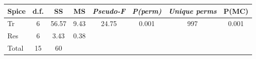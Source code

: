 \begin{tabular}{lccccccc}
	\toprule
		\textbf{Spice}	& \textbf{d.f.}	& \textbf{SS}	& \textbf{MS}	& \textbf{\emph{Pseudo-F}}	& \textbf{\emph{P(perm)}}	& \textbf{\emph{Unique perms}}	& \textbf{P(MC)} \\
	\midrule
		Tr				& \num{6}		& \num{56,57}	& \num{9,43}	& \num{24,75}		& \num{0,001}		& \num{997}				& \num{0,001} \\[\spbtwrowsA]
		Res				& \num{6}		& \num{3,43}	& \num{0,38}	& 					& 					& 						&  \\[\spbtwrowsA]
		Total			& \num{15}		& \num{60}		& 				& 					& 					& 						&  \\[\spbtwrowsA]
	\bottomrule
\end{tabular}